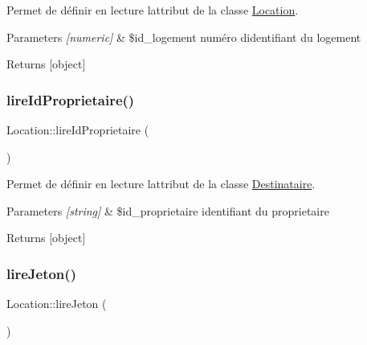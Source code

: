 Permet de définir en lecture l\textquotesingle{}attribut de la classe \hyperlink{class_location}{Location}. 


\begin{DoxyParams}{Parameters}
{\em \mbox{[}numeric\mbox{]}} & \$id\+\_\+logement numéro d\textquotesingle{}identifiant du logement \\
\hline
\end{DoxyParams}
\begin{DoxyReturn}{Returns}
\mbox{[}object\mbox{]} 
\end{DoxyReturn}
\mbox{\label{class_location_abf635ae33c10e78ad1471fc72d4520ec}} 
\subsubsection{\texorpdfstring{lire\+Id\+Proprietaire()}{lireIdProprietaire()}}
{\footnotesize\ttfamily Location\+::lire\+Id\+Proprietaire (\begin{DoxyParamCaption}{ }\end{DoxyParamCaption})}



Permet de définir en lecture l\textquotesingle{}attribut de la classe \hyperlink{class_destinataire}{Destinataire}. 


\begin{DoxyParams}{Parameters}
{\em \mbox{[}string\mbox{]}} & \$id\+\_\+proprietaire identifiant du proprietaire \\
\hline
\end{DoxyParams}
\begin{DoxyReturn}{Returns}
\mbox{[}object\mbox{]} 
\end{DoxyReturn}
\mbox{\label{class_location_aa3e283dd18d0849aae29d32a517f5d91}} 
\subsubsection{\texorpdfstring{lire\+Jeton()}{lireJeton()}}
{\footnotesize\ttfamily Location\+::lire\+Jeton (\begin{DoxyParamCaption}{ }\end{DoxyParamCaption})}



